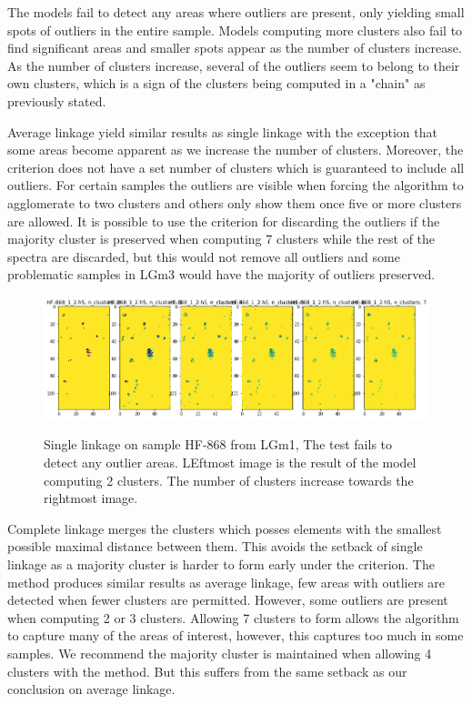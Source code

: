 The models fail to detect any areas where outliers are present, only yielding small spots of outliers in the entire sample. Models computing more clusters also fail to find significant areas and smaller spots appear as the number of clusters increase. As the number of clusters increase, several of the outliers seem to belong to their own clusters, which is a sign of the clusters being computed in a "chain" as previously stated.


Average linkage yield similar results as single linkage with the exception that some areas become apparent as we increase the number of clusters. Moreover, the criterion does not have a set number of clusters which is guaranteed to include all outliers. For certain samples the outliers are visible when forcing the algorithm to agglomerate to two clusters and others only show them once five or more clusters are allowed. It is possible to use the criterion for discarding the outliers if the majority cluster is preserved when computing 7 clusters while the rest of the spectra are discarded, but this would not remove all outliers and some problematic samples in LGm3 would have the majority of outliers preserved. 

\begin{figure}[H]

    \centering
{\includegraphics[width=15cm]{images/Average_linkage/LGm-1/HF-868_1_2.h5_0.png} }
\caption{Single linkage on sample HF-868 from LGm1, The test fails to detect any outlier areas. LEftmost image is the result of the model computing 2 clusters. The number of clusters increase towards the rightmost image.\label{fig:SL_HF868}}%

\end{figure}

Complete linkage merges the clusters which posses elements with the smallest possible maximal distance between them. This avoids the setback of single linkage as a majority cluster is harder to form early under the criterion. The method produces similar results as average linkage, few areas with outliers are detected when fewer clusters are permitted. However, some outliers are present when computing 2 or 3 clusters. Allowing 7 clusters to form allows the algorithm to capture many of the areas of interest, however, this captures too much in some samples. We recommend the majority cluster is maintained when allowing 4 clusters with the method. But this suffers from the same setback as our conclusion on average linkage.

